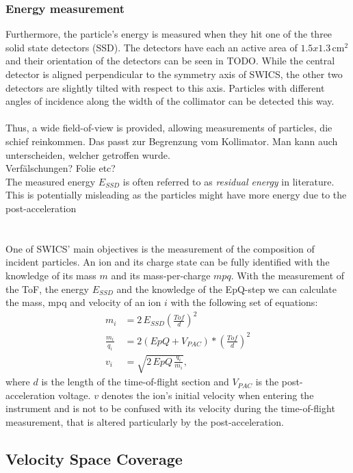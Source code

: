 \subsubsection{Energy measurement}
Furthermore, the particle's energy is measured when they hit one of the three solid state detectors (SSD). The detectors have each an active area of $1.5 x 1.3 \,\mathrm{cm^2}$ and their orientation of the detectors can be seen in TODO. While the central detector is aligned perpendicular to the symmetry axis of SWICS, the other two detectors are slightly tilted with respect to this axis. Particles with different angles of incidence along the width of the collimator can be detected this way.
\\ \\
Thus, a wide field-of-view is provided, allowing measurements of particles, die schief reinkommen. Das passt zur Begrenzung vom Kollimator. Man kann auch unterscheiden, welcher getroffen wurde.\\
Verfälschungen? Folie etc? \\ 
The measured energy $E_{SSD}$ is often referred to as \textit{residual energy} in literature. This is potentially misleading as the particles might have more energy due to the post-acceleration 
\\ \\ \\
One of SWICS' main objectives is the measurement of the composition of incident particles. An ion and its charge state can be fully identified with the knowledge of its mass $m$ and its mass-per-charge $mpq$. 
With the measurement of the ToF, the energy $E_{SSD}$ and the knowledge of the EpQ-step we can calculate the mass, mpq and velocity of an ion $i$ with the following set of equations:
\begin{align*}
m_i &= 2\,E_{SSD} \left( \frac{Tof}{d}\right)^2 \\
\frac{m_i}{q_i} &= 2 \left(EpQ + V_{PAC}\right) * \left(\frac{Tof}{d}\right)^2 \\
v_i &= \sqrt{2\,EpQ\,\frac{q_i}{m_i}},
\end{align*}
where $d$ is the length of the time-of-flight section and $V_{PAC}$ is the post-acceleration voltage. $v$ denotes the ion's initial velocity when entering the instrument and is not to be confused with its velocity during the time-of-flight measurement, that is altered particularly by the post-acceleration.
\subsection{Velocity Space Coverage}
